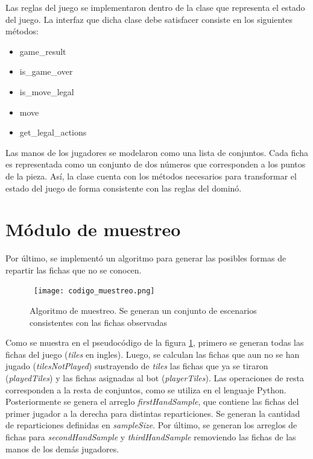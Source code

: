 Las reglas del juego se implementaron dentro de la clase que representa el
estado del juego. La interfaz que dicha clase debe satisfacer consiste en los
siguientes métodos:

\begin{itemize}
   \item game\_result
   \item is\_game\_over
   \item is\_move\_legal
   \item move
   \item get\_legal\_actions
\end{itemize}

Las manos de los jugadores se modelaron como una lista de conjuntos. Cada ficha
es representada como un conjunto de dos números que corresponden a los puntos de
la pieza. Así, la clase cuenta con los métodos necesarios para transformar el
estado del juego de forma consistente con las reglas del dominó.

\section{Módulo de muestreo}

Por último, se implementó un algoritmo para generar las posibles formas de
repartir las fichas que no se conocen.

\begin{figure}[ht]
   \begin{center}
      \hbox{\hspace{-1.5em} \texttt{[image: codigo\_muestreo.png]}}
      \caption{Algoritmo de muestreo. Se generan un conjunto de escenarios consistentes con las fichas observadas}
      \label{CM}
   \end{center}
\end{figure}

Como se muestra en el pseudocódigo de la figura \ref{CM}, primero se generan
todas las fichas del juego (\textit{tiles} en ingles). Luego, se calculan las
fichas que aun no se han jugado (\textit{tilesNotPlayed}) sustrayendo de
\textit{tiles} las fichas que ya se tiraron (\textit{playedTiles}) y las fichas
asignadas al bot (\textit{playerTiles}). Las operaciones de resta corresponden a
la resta de conjuntos, como se utiliza en el lenguaje Python. Posteriormente se
genera el arreglo \textit{firstHandSample}, que contiene las fichas del primer
jugador a la derecha para distintas reparticiones. Se generan la cantidad de
reparticiones definidas en \textit{sampleSize}. Por último, se generan los
arreglos de fichas para \textit{secondHandSample}  y \textit{thirdHandSample}
removiendo las fichas de las manos de los demás jugadores.

